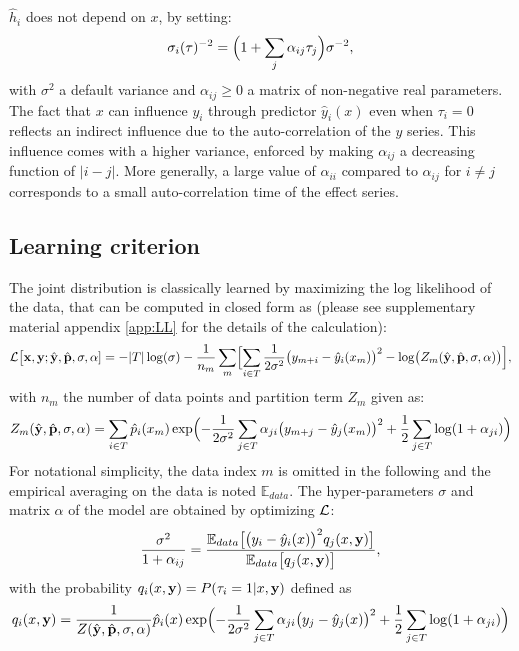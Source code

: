 $\hat h_i$ does not depend on $x$, by setting:
\[
\sigma_i({\bf \tau})^{-2} = \Bigl(1+\sum_j\alpha_{ij} \tau_j\Bigr)\sigma^{-2},
\]
with $\sigma^2$ a default variance and $\alpha_{ij}\ge 0$ a matrix of non-negative real parameters. 
The fact that $x$ can influence $y_i$ through predictor $\hat y_i(x)$ even when $\tau_i=0$ reflects 
an indirect influence due to the auto-correlation of the $y$ series. This influence comes with a 
higher variance, enforced by making $\alpha_{ij}$ a decreasing function of $\vert i-j\vert$. More 
generally, a large value of $\alpha_{ii}$ compared to $\alpha_{ij}$ for $i\ne j$ corresponds to a 
small auto-correlation time of the effect series. 

\subsection{Learning criterion}
The joint distribution is classically learned by maximizing the log likelihood of the data, that 
can be computed in closed form as (please see supplementary material appendix \ref{app:LL} for the 
details of the calculation): 
%
\begin{equation}\label{eq:LL}
  {\cal L}\bigl[ {\bf x, y};\hat {\bf y},\hat{\bf p},\sigma,{\bf \alpha}] = 
  -\vert T\vert\log(\sigma)-\frac{1}{n_m}\sum_m\Bigl[
    \sum_{i \in T}\frac{1}{2\sigma^2}\bigl(y_{m+i}-\hat y_i(x_m)\bigr)^2 - 
    \log\bigl(Z_m(\hat {\bf y},\hat{\bf p},\sigma,{\bf \alpha})\bigr)\Bigr],
\end{equation}
%
with $n_m$ the number of data points and partition term $Z_m$ given as:
\[
  Z_m(\hat {\bf y},\hat{\bf p},\sigma,{\bf \alpha}) = \sum_{i \in T}\hat p_i(x_m)\exp\Bigl(
    - \frac{1}{2\sigma^2}\sum_{j\in T}\alpha_{ji}\bigl(y_{m+j}-\hat y_j(x_m)\bigr)^2 
    + \frac{1}{2}\sum_{j\in T}\log(1+\alpha_{ji})\Bigr)
\]
For notational simplicity, the data index $m$ is omitted in the following and the empirical 
averaging on the data is noted ${\mathbb E}_{data}$. The hyper-parameters $\sigma$ and matrix 
$\alpha$ of the model are obtained by optimizing  ${\cal L}$:
%
\begin{equation}\label{eq:var}
  \frac{\sigma^2}{1+\alpha_{ij}} = 
  \frac{
    {\mathbb E}_{data}\bigl[\bigl(y_i-\hat y_i(x)\bigr)^2q_j(x,{\bf y})\bigr]
  }{
    {\mathbb E}_{data}\bigl[q_j(x,{\bf y})\bigr]
  },
\end{equation}
%
with the probability $q_i(x,{\bf y}) = P(\tau_i=1\vert x,{\bf y})$ defined as
%
\begin{equation}\label{eq:hatpi}
  q_i(x,{\bf y}) = \frac{1}{
    Z(\hat {\bf y},\hat{\bf p},\sigma,{\bf \alpha})
  } \hat p_i(x) 
  \exp\Bigl(
    - \frac{1}{2\sigma^2}\sum_{j\in T}\alpha_{ji}\bigl(y_j-\hat y_j(x)\bigr)^2 
    + \frac{1}{2}\sum_{j\in T}\log(1+\alpha_{ji})
  \Bigr)
\end{equation}
